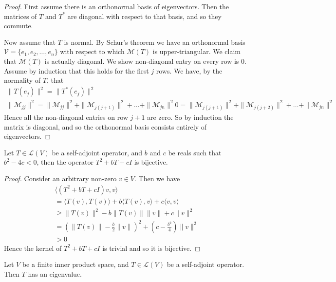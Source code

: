 \documentclass[]{article}
\begin{document}
\begin{proof}
		First assume there is an orthonormal basis of eigenvectors. Then the matrices of $T$ and $T^*$ are diagonal with respect to that basis, and so they commute.	

		Now assume that $T$ is normal. By Schur's theorem we have an orthonormal basis $\mathcal{V} = \{e_1,e_2,\ldots,e_n\}$ with respect to which $\mathcal{M}(T)$ is upper-triangular. We claim that $\mathcal{M}(T)$ is actually diagonal. We show non-diagonal entry on every row is $0$. Assume by induction that this holds for the first $j$ rows. We have, by the normality of $T$, that
		\begin{align*}
				\|T(e_j)\|^2 = \|T^*(e_j)\|^2 \\
				\|\mathcal{M}_{jj}\|^2 = \|\mathcal{M}_{jj}\|^2 + \|\mathcal{M}_{j(j+1)}\|^2 + \ldots +  \|\mathcal{M}_{jn}\|^2 
				0 = \|\mathcal{M}_{j(j+1)}\|^2 + \|\mathcal{M}_{j(j+2)}\|^2 + \ldots +  \|\mathcal{M}_{jn}\|^2 
		\end{align*}
		Hence all the non-diagonal entries on row $j+1$ are zero. So by induction the matrix is diagonal, and so the orthonormal basis consists entirely of eigenvectors.
\end{proof}

\begin{thm} \label{thm:irreducible-quadratics}
		Let $T \in \mathcal{L}(V)$ be a self-adjoint operator, and $b$ and $c$ be reals such that $b^2 - 4c < 0$, then the operator $T^2 + bT + cI$ is bijective.
\end{thm}

\begin{proof}
		Consider an arbitrary non-zero $v \in V$. Then we have 
		\begin{align*}
				\langle (T^2 + bT + cI)v, v \rangle  \\
				= \langle T(v), T(v) \rangle + b\langle T(v), v \rangle + c \langle v, v \rangle \\
				\geq \|T(v)\|^2 - b \|T(v)\|\|v\| + c \|v\|^2 \\
				= (\|T(v)\| - \frac{b}{2} \|v\|)^2 + (c - \frac{b^2}{4})\|v\|^2 \\
				> 0
		\end{align*}
		Hence the kernel of  $T^2 + bT + cI$ is trivial and so it is bijective.
\end{proof}

\begin{thm}
		Let $V$ be a finite inner product space, and $T \in \mathcal{L}(V)$ be a self-adjoint operator. Then $T$ has an eigenvalue.
\end{thm}
\end{document}
